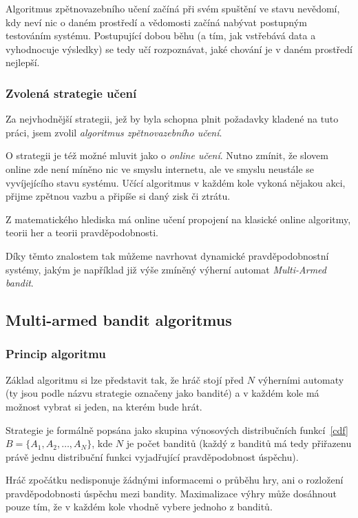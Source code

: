 \documentclass[thesis=M,czech]{FITthesis}[2014/05/07]
\begin{document}
Algoritmus zpětnovazebního učení začíná při svém spuštění ve stavu nevědomí, kdy neví nic o daném prostředí a vědomosti začíná nabývat postupným testováním systému. Postupující dobou běhu (a tím, jak vstřebává data a vyhodnocuje výsledky) se tedy učí rozpoznávat, jaké chování je v daném prostředí nejlepší.

\subsubsection{Zvolená strategie učení}
\label{sub:online}
Za nejvhodnější strategii, jež by byla schopna plnit požadavky kladené na tuto práci, jsem zvolil \emph{algoritmus zpětnovazebního učení}.

O strategii je též možné mluvit jako o \emph{online učení}. Nutno zmínit, že slovem online zde není míněno nic ve smyslu internetu, ale ve smyslu neustále se vyvíjejícího stavu systému. Učící algoritmus v každém kole vykoná nějakou akci, přijme zpětnou vazbu a připíše si daný zisk či ztrátu.

Z matematického hlediska má online učení propojení na klasické online algoritmy, teorii her a teorii pravděpodobnosti.

Díky těmto znalostem tak můžeme navrhovat dynamické pravděpodobnostní systémy, jakým je například již výše zmíněný výherní automat \emph{Multi-Armed bandit}.

\subsection{Multi-armed bandit algoritmus}
\label{sec:multi}

\subsubsection{Princip algoritmu}
Základ algoritmu si lze představit tak, že hráč stojí před $N$ výherními automaty (ty jsou podle názvu strategie označeny jako bandité) a v každém kole má možnost vybrat si jeden, na kterém bude hrát.

Strategie je formálně popsána jako skupina výnosových distribučních funkcí~\ref{cdf} $B = \{ A_1, A_2, \ldots, A_N \}$, kde $N$ je počet banditů (každý z banditů má tedy přiřazenu právě jednu distribuční funkci vyjadřující pravděpodobnost úspěchu). 

Hráč zpočátku nedisponuje žádnými informacemi o průběhu hry, ani o rozložení pravděpodobnosti úspěchu mezi bandity. Maximalizace výhry může dosáhnout pouze tím, že v každém kole vhodně vybere jednoho z banditů.
\end{document}
